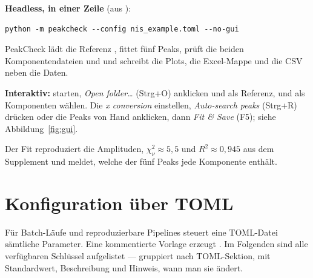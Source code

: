 \documentclass[11pt,a4paper]{article}
\begin{document}
\noindent\textbf{Headless, in einer Zeile} (aus ):
\begin{lstlisting}[style=py]
python -m peakcheck --config nis_example.toml --no-gui
\end{lstlisting}
PeakCheck l\"adt die Referenz , fittet f\"unf Peaks, pr\"uft die
beiden Komponentendateien  und  und schreibt
die Plots, die Excel-Mappe und die CSV neben die Daten.

\noindent\textbf{Interaktiv:}  starten, \emph{Open folder\dots}
(Strg+O) anklicken und  als Referenz,  und
 als Komponenten w\"ahlen. Die \emph{x conversion}
 einstellen, \emph{Auto-search peaks} (Strg+R) dr\"ucken oder die
Peaks von Hand anklicken, dann \emph{Fit \& Save} (F5); siehe
Abbildung~\ref{fig:gui}.

\noindent Der Fit reproduziert die Amplituden, $\chi^2_\nu\approx5{,}5$ und
$R^2\approx0{,}945$ aus dem Supplement und meldet, welche der f\"unf Peaks jede
Komponente enth\"alt.

\section{Konfiguration \"uber TOML}
F\"ur Batch-L\"aufe und reproduzierbare Pipelines steuert eine TOML-Datei
s\"amtliche Parameter. Eine kommentierte Vorlage erzeugt
. Im Folgenden sind alle
verf\"ugbaren Schl\"ussel aufgelistet --- gruppiert nach TOML-Sektion, mit
Standardwert, Beschreibung und Hinweis, wann man sie \"andert.
\end{document}
